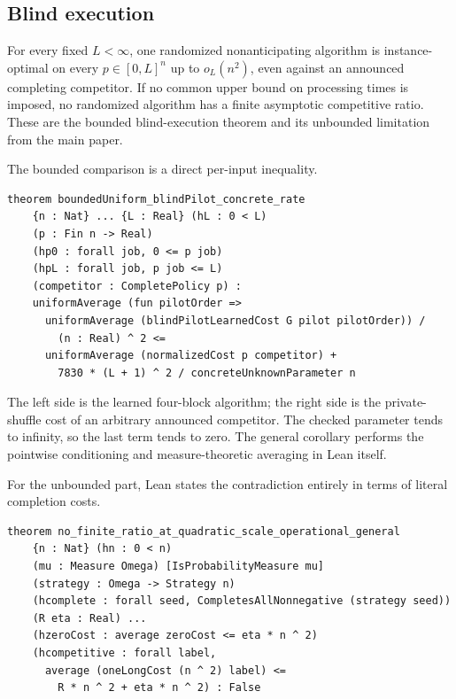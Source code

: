\subsection{Blind execution}

\begin{theorem}
\label{thm:lean-audit-blind-execution}
For every fixed $L<\infty$, one randomized nonanticipating algorithm is
instance-optimal on every $p\in[0,L]^n$ up to $o_L(n^2)$, even against an
announced completing competitor.  If no common upper bound on processing
times is imposed, no randomized algorithm has a finite asymptotic
competitive ratio.  These are the bounded blind-execution theorem and its
unbounded limitation from the main paper.
\end{theorem}

The bounded comparison is a direct per-input inequality.

\begin{lstlisting}[style=lean]
theorem boundedUniform_blindPilot_concrete_rate
    {n : Nat} ... {L : Real} (hL : 0 < L)
    (p : Fin n -> Real)
    (hp0 : forall job, 0 <= p job)
    (hpL : forall job, p job <= L)
    (competitor : CompletePolicy p) :
    uniformAverage (fun pilotOrder =>
      uniformAverage (blindPilotLearnedCost G pilot pilotOrder)) /
        (n : Real) ^ 2 <=
      uniformAverage (normalizedCost p competitor) +
        7830 * (L + 1) ^ 2 / concreteUnknownParameter n
\end{lstlisting}

The left side is the learned four-block algorithm; the right side is the
private-shuffle cost of an arbitrary announced competitor.  The checked
parameter tends to infinity, so the last term tends to zero.  The general
corollary  performs the
pointwise conditioning and measure-theoretic averaging in Lean itself.

For the unbounded part, Lean states the contradiction entirely in terms of
literal completion costs.

\begin{lstlisting}[style=lean]
theorem no_finite_ratio_at_quadratic_scale_operational_general
    {n : Nat} (hn : 0 < n)
    (mu : Measure Omega) [IsProbabilityMeasure mu]
    (strategy : Omega -> Strategy n)
    (hcomplete : forall seed, CompletesAllNonnegative (strategy seed))
    (R eta : Real) ...
    (hzeroCost : average zeroCost <= eta * n ^ 2)
    (hcompetitive : forall label,
      average (oneLongCost (n ^ 2) label) <=
        R * n ^ 2 + eta * n ^ 2) : False
\end{lstlisting}

